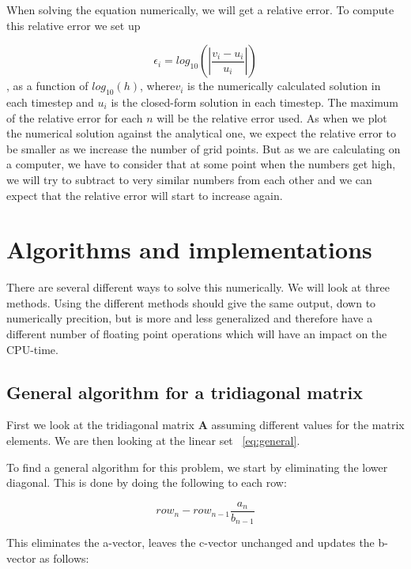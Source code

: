 \documentclass[a4paper,norsk,12pt,oneside]{article}
\begin{document}
When solving the equation numerically, we will get a relative error.
To compute this relative error we set up 

\begin{equation*}
    \epsilon_i = log_{10} \left ( \left | \frac{v_i - u_i}{u_i} \right | \right )
\end{equation*}, 
as a function of \(log_{10}(h)\), where\(v_i\) is the numerically calculated solution
in each timestep and \(u_i\) is the closed-form solution in each timestep. The maximum of
the relative error for each \(n\) will be the relative error used. 
As when we plot the numerical solution against the analytical one, we expect the relative 
error to be smaller as we increase the number of grid points. But as we are calculating 
on a computer, we have to consider that at some point when the numbers get high,
we will try to subtract to very similar numbers from each other and we can expect that the relative
error will start to increase again. 

\section{Algorithms and implementations}

There are several different ways to solve this numerically. We will look at three methods.
Using the different methods should give the same output, down to numerically precition, 
but is more and less generalized and therefore have a different number of floating point
operations which will have an impact on the CPU-time. 

\subsection{General algorithm for a tridiagonal matrix}\label{subsec:general}

First we look at the tridiagonal matrix \(\textbf{A}\) assuming different values
for the matrix elements. 
We are then looking at the linear set ~\ref{eq:general}. 

To find a general algorithm for this problem, we start by eliminating the lower diagonal.
This is done by doing the following to each row: 

\begin{equation}\label{eq:rowred}
    row_n - row_{n-1} \frac{a_n}{b_{n-1}}
\end{equation}

This eliminates the a-vector, leaves the c-vector unchanged and updates the b-vector as follows:
\end{document}
